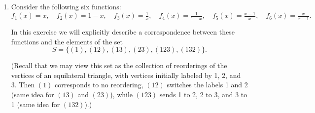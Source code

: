 \begin{enumerate}
    \item Consider the following six functions:
    \[
    f_1(x) = x, \quad
    f_2(x) = 1 - x, \quad
    f_3(x) = \tfrac{1}{x}, \quad
    f_4(x) = \tfrac{1}{1 - x}, \quad
    f_5(x) = \tfrac{x - 1}{x}, \quad
    f_6(x) = \tfrac{x}{x - 1}.
    \]

    In this exercise we will explicitly describe a correspondence between these
    functions and the elements of the set
    \[
    S = \{ (1), (12), (13), (23), (123), (132) \}.
    \]

    (Recall that we may view this set as the collection of reorderings of the
    vertices of an equilateral triangle, with vertices initially labeled by
    1, 2, and 3. Then $(1)$ corresponds to no reordering, $(12)$ switches the
    labels 1 and 2 (same idea for $(13)$ and $(23)$), while $(123)$ sends 1 to
    2, 2 to 3, and 3 to 1 (same idea for $(132)$).)


\end{enumerate}
